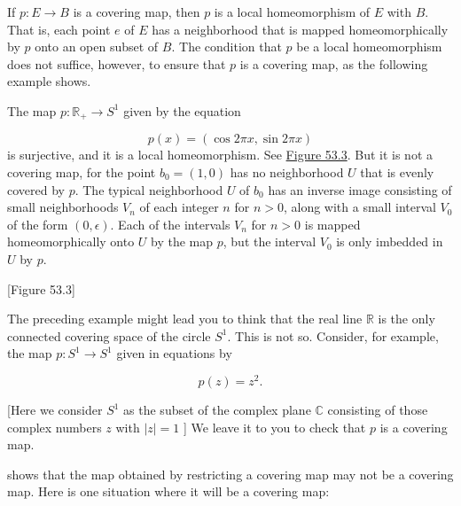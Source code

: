 If \(p : E \rightarrow B\) is a covering map, then \(p\) is a local homeomorphism of \(E\) with \(B\). That is, each point \(e\) of \(E\) has a neighborhood that is mapped homeomorphically by \(p\) onto an open subset of \(B\). The condition that \(p\) be a local homeomorphism does not suffice, however, to ensure that \(p\) is a covering map, as the following example shows.

\begin{centeredblock}
\begin{example}
\label{ex:\thesection.\theexample}
The map \(p : \mathbb{R}_{ + } \rightarrow {S}^{1}\) given by the equation

\[
p(x) = ( {\cos {2\pi x},\sin {2\pi x}})
\]
is surjective, and it is a local homeomorphism. See \hyperref[fig:53.3]{Figure 53.3}. But it is not a covering map, for the point \(b_{0} = ( {1,0})\) has no neighborhood \(U\) that is evenly covered by \(p\). The typical neighborhood \(U\) of \(b_{0}\) has an inverse image consisting of small neighborhoods \(V_{n}\) of each integer \(n\) for \(n > 0\), along with a small interval \(V_{0}\) of the form \(( {0,\epsilon })\). Each of the intervals \(V_{n}\) for \(n > 0\) is mapped homeomorphically onto \(U\) by the map \(p\), but the interval \(V_{0}\) is only imbedded in \(U\) by \(p\).

[Figure 53.3]
\end{example}
\end{centeredblock}

\begin{centeredblock}
\begin{example}
\label{ex:\thesection.\theexample}
The preceding example might lead you to think that the real line \(\mathbb{R}\) is the only connected covering space of the circle \(S^{1}\). This is not so. Consider, for example, the map \(p : S^{1} \rightarrow {S}^{1}\) given in equations by

\[
p( z) = z^{2}.
\]

[Here we consider \(S^{1}\) as the subset of the complex plane \(\mathbb{C}\) consisting of those complex numbers \(z\) with \(| z| = 1\) ] We leave it to you to check that \(p\) is a covering map.
\end{example}
\end{centeredblock}

 shows that the map obtained by restricting a covering map may not be a covering map. Here is one situation where it will be a covering map:

